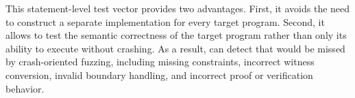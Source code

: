 This statement-level test vector provides two advantages. First, it avoids the need to construct a separate \zksnark implementation for every target program. Second, it allows \greyboxfuzz to test the semantic correctness of the target program rather than only its ability to execute without crashing. As a result, \greyboxfuzz can detect \logicerror that would be missed by crash-oriented fuzzing, including missing constraints, incorrect witness conversion, invalid boundary handling, and incorrect proof or verification behavior.


